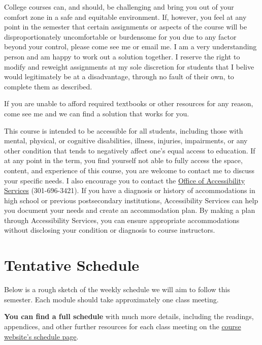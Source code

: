 \documentclass{article}
\begin{document}
College courses can, and should, be challenging and bring you out of
your comfort zone in a safe and equitable environment. If, however, you
feel at any point in the semester that certain assignments or aspects of
the course will be disproportionately uncomfortable or burdensome for
you due to any factor beyond your control, please come see me or email
me. I am a very understanding person and am happy to work out a solution
together. I reserve the right to modify and reweight assignments at my
sole discretion for students that I belive would legitimately be at a
disadvantage, through no fault of their own, to complete them as
described.

If you are unable to afford required textbooks or other resources for
any reason, come see me and we can find a solution that works for you.

This course is intended to be accessible for all students, including
those with mental, physical, or cognitive disabilities, illness,
injuries, impairments, or any other condition that tends to negatively
affect one's equal access to education. If at any point in the term, you
find yourself not able to fully access the space, content, and
experience of this course, you are welcome to contact me to discuss your
specific needs. I also encourage you to contact the
\href{https://www.hood.edu/academics/josephine-steiner-center-academic-achievement-retention/accessibility-services}{Office
of Accessibility Services} (301-696-3421). If you have a diagnosis or
history of accommodations in high school or previous postsecondary
institutions, Accessibility Services can help you document your needs
and create an accommodation plan. By making a plan through Accessibility
Services, you can ensure appropriate accommodations without disclosing
your condition or diagnosis to course instructors.

\hypertarget{tentative-schedule}{%
\section*{Tentative Schedule}\label{tentative-schedule}}

Below is a rough sketch of the weekly schedule we will aim to follow
this semester. Each module should take approximately one class meeting.

\textbf{You can find a full schedule} with much more details, including
the readings, appendices, and other further resources for each class
meeting on the
\href{http://thoughtF20.classes.ryansafner.com/schedule/}{course
website's schedule page}.
\end{document}

